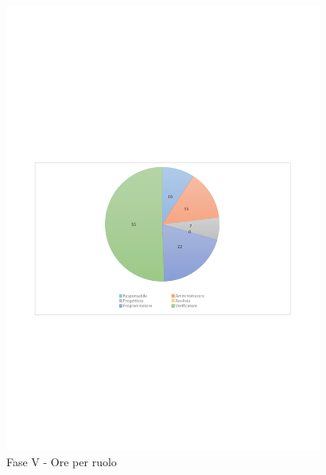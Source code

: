 \documentclass[../PianoProgetto.tex]{subfiles}
\begin{document}
	\begin{figure}[H]
		\centering
		\includegraphics[width=0.93\textwidth , trim=1.5cm 9cm 1.5cm 9cm]{grafici/V/V-ore-ruolo}
			\caption{Fase V - Ore per ruolo}
		\label{fig:CircleChart-faseV_ore_r}
	\end{figure}
\vfill	
\newpage
\end{document}
